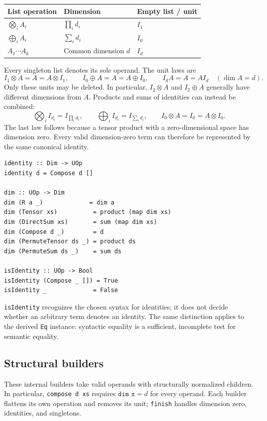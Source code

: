 \documentclass[11pt,a4paper]{article}
\newcommand{\code}[1]{\texttt{#1}}
\begin{document}
\begin{center}
\begin{tabularx}{\linewidth}{@{}lLL@{}}
\toprule
List operation & Dimension & Empty list / unit\\
\midrule
$\bigotimes_i A_i$ & $\prod_i d_i$ & $I_1$\\
$\bigoplus_i A_i$ & $\sum_i d_i$ & $I_0$\\
$A_1\cdots A_k$ & Common dimension $d$ & $I_d$\\
\bottomrule
\end{tabularx}
\end{center}
Every singleton list denotes its sole operand. The unit laws are
\[
 I_1\otimes A=A=A\otimes I_1,\qquad
 I_0\oplus A=A=A\oplus I_0,\qquad
 I_dA=A=AI_d\quad(\dim A=d).
\]
Only these units may be deleted. In particular, $I_2\otimes A$ and
$I_2\oplus A$ generally have different dimensions from $A$.
Products and sums of identities can instead be combined:
\[
 \bigotimes_i I_{d_i}=I_{\prod_i d_i},\qquad
 \bigoplus_i I_{d_i}=I_{\sum_i d_i},\qquad
 I_0\otimes A=I_0=A\otimes I_0.
\]
The last law follows because a tensor product with a zero-dimensional
space has dimension zero. Every valid dimension-zero term can therefore
be represented by the same canonical identity.

\begin{lstlisting}
identity :: Dim -> UOp
identity d = Compose d []

dim :: UOp -> Dim
dim (R a _)             = dim a
dim (Tensor xs)          = product (map dim xs)
dim (DirectSum xs)       = sum (map dim xs)
dim (Compose d _)        = d
dim (PermuteTensor ds _) = product ds
dim (PermuteSum ds _)    = sum ds

isIdentity :: UOp -> Bool
isIdentity (Compose _ []) = True
isIdentity _             = False
\end{lstlisting}

\code{isIdentity} recognizes the chosen syntax for identities; it does
not decide whether an arbitrary term denotes an identity. The same
distinction applies to the derived \code{Eq} instance: syntactic equality
is a sufficient, incomplete test for semantic equality.

\subsection{Structural builders}

These internal builders take valid operands with structurally normalized
children. In particular, \code{compose d xs} requires $\code{dim x}=d$
for every operand. Each builder flattens its own operation and removes
its unit; \code{finish} handles dimension zero, identities, and singletons.
\end{document}
